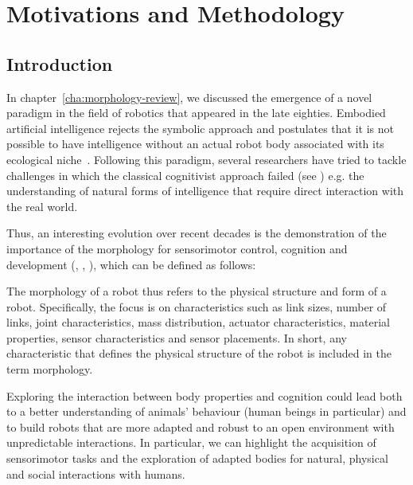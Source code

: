 
\cleartoleftpage


\chapter{Motivations and Methodology}
\label{cha:methodology}

\section{Introduction} %

In chapter~\ref{cha:morphology-review}, we discussed the emergence of a novel paradigm in the field of robotics that appeared in the late eighties.  Embodied artificial intelligence rejects the symbolic approach and postulates that it is not possible to have intelligence without an actual robot body associated with its ecological niche~\parencite{pfeifer2001understanding}. Following this paradigm, several researchers have tried to tackle challenges in which the classical cognitivist approach failed (see \parencite{brooks1986achieving}) e.g. the understanding of natural forms of intelligence that require direct interaction with the real world.

Thus, an interesting evolution over recent decades is the demonstration of the importance of the morphology for sensorimotor control, cognition and development (\cite{kaplan2008corps}, \cite{steels1995artificial}, \cite{Pfeifer06}), which can be defined as follows:
\begin{formal}
    The morphology of a robot thus refers to the physical structure and form of a robot. Specifically, the focus is on characteristics such as link sizes, number of links, joint characteristics, mass distribution, actuator characteristics, material properties, sensor characteristics and sensor placements. In short, any characteristic that defines the physical structure of the robot is included in the term morphology.
\end{formal}

Exploring the interaction between body properties and cognition could lead both to a better understanding of animals’ behaviour (human beings in particular) and to build robots that are more adapted and robust to an open environment with unpredictable interactions. In particular, we can highlight the acquisition of sensorimotor tasks and the exploration of adapted bodies for natural, physical and social interactions with humans.

